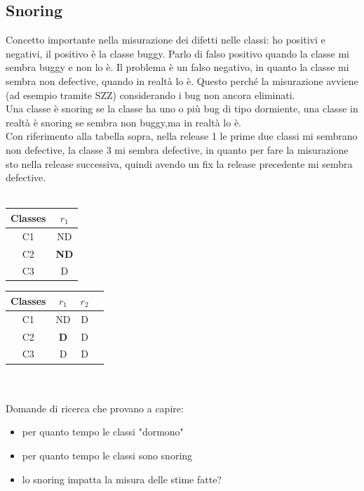 \documentclass{article}
\begin{document}
\subsection{Snoring}
Concetto importante nella misurazione dei difetti nelle classi: ho positivi e negativi, il positivo è la classe buggy. Parlo di falso positivo quando la classe mi sembra buggy e non lo è. Il problema è un falso negativo, in quanto la classe mi sembra non defective, quando in realtà lo è. Questo perché la misurazione avviene (ad esempio tramite SZZ) considerando i bug non ancora eliminati.\\ Una classe è snoring se la classe ha uno o più bug di tipo dormiente, una classe in realtà è snoring se sembra non buggy,ma in realtà lo è.\\ Con riferimento alla tabella sopra, nella release 1 le prime due classi mi sembrano non defective, la classe 3 mi sembra defective, in quanto per fare la misurazione sto nella release successiva, quindi avendo un fix la release precedente mi sembra defective.\\\\
\begin{minipage}[t]{0.5\textwidth}
\begin{tabular}{ |c|c|}
\hline
Classes & $r_1$\\
\hline
C1 & ND\\
\hline
C2 & \textbf{ND}\\
\hline
C3 & D\\
\hline
\end{tabular}
\end{minipage}%
\begin{minipage}[t]{0.5\textwidth}
\begin{tabular}{ |c|c|c|c|}
\hline
Classes & $r_1$ & $r_2$\\
\hline
C1 & ND & D\\
\hline
C2 & \textbf{D} & D\\
\hline
C3 & D & D\\
\hline
\end{tabular}
\end{minipage}%
\\\\
Domande di ricerca che provano a capire:
\begin{itemize}
\item per quanto tempo le classi "dormono"
\item per quanto tempo le classi sono snoring
\item lo snoring impatta la misura delle stime fatte?
\end{itemize}
\end{document}
